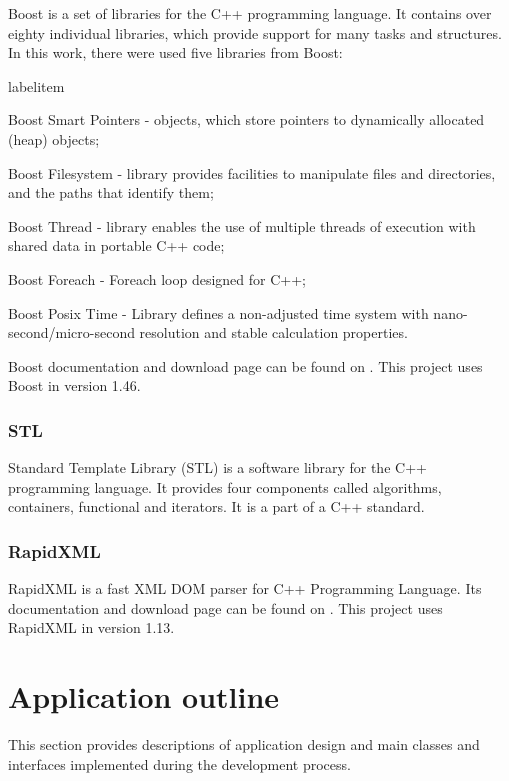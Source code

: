 \documentclass[a4paper,onecolumn,oneside,12pt]{memoir}
\makeatletter
\renewenvironment{itemize}{
  \begin{list}{  
  \csname labelitem\romannumeral\the\@listdepth\endcsname}{
  \setlength{\leftmargin}{1em}
	\setlength{\topsep}{6pt}%
	\setlength{\partopsep}{0pt}%
	\setlength{\parskip}{0pt}%
	\setlength{\parsep}{0pt}%
	\setlength{\itemsep}{0pt}}
}{
  \end{list}
}
\makeatother
\begin{document}
Boost \cite{boostWiki} is a set of libraries for the C++ programming language. It 
contains over eighty individual libraries, which provide support for many tasks and structures.
In this work, there were used five libraries from Boost:
\begin{itemize}
  \item Boost Smart Pointers - objects, which store pointers to dynamically allocated (heap) objects;
  \item Boost Filesystem - library provides facilities to manipulate files and directories, and the
        paths that identify them;
  \item Boost Thread - library enables the use of multiple threads of execution with shared data in
        portable C++ code;
  \item Boost Foreach - Foreach loop designed for C++;
  \item Boost Posix Time - Library defines a non-adjusted time system with nano-second/micro-second
        resolution and stable calculation properties.
\end{itemize}

Boost documentation and download page can be found on \cite{boostMainPage}. This project uses Boost
in version 1.46.

\subsubsection{STL}

Standard Template Library (STL) \cite{stlWiki} is a software library for the C++
programming language. It provides four components called algorithms, containers, functional and
iterators. It is a part of a C++ standard.

\subsubsection{RapidXML}

RapidXML is a fast XML DOM parser for C++ Programming Language. Its documentation and download page
can be found on \cite{rapidXmlMainPage}. This project uses RapidXML in version 1.13.

\section{Application outline}

This section provides descriptions of application design and main classes and interfaces implemented
during the development process.
\end{document}
